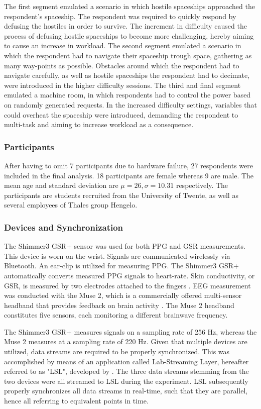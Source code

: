 \documentclass[12pt]{article}
\begin{document}
The first segment emulated a scenario in which hostile spaceships approached the respondent's spaceship. The respondent was required to quickly respond by defusing the hostiles in order to survive. The increment in difficulty caused the process of defusing hostile spaceships to become more challenging, hereby aiming to cause an increase in workload. The second segment emulated a scenario in which the respondent had to navigate their spaceship trough space, gathering as many way-points as possible. Obstacles around which the respondent had to navigate carefully, as well as hostile spaceships the respondent had to decimate, were introduced in the higher difficulty sessions. The third and final segment emulated a machine room, in which respondents had to control the power based on randomly generated requests. In the increased difficulty settings, variables that could overheat the spaceship were introduced, demanding the respondent to multi-task and aiming to increase workload as a consequence.

\subsubsection{Participants}
After having to omit 7 participants due to hardware failure, 27 respondents were included in the final analysis.  18 participants are female whereas 9 are male. The mean age and standard deviation are $\mu =26, \sigma = 10.31$ respectively. The participants are students recruited from the University of Twente, as well as several employees of Thales group Hengelo. 

\subsubsection{Devices and Synchronization}
The Shimmer3 GSR+ sensor was used for both PPG and GSR measurements. This device is worn on the wrist. Signals are communicated wirelessly via Bluetooth. An ear-clip is utilized for measuring PPG. The Shimmer3 GSR+ automatically converts measured PPG signals to heart-rate. Skin conductivity, or GSR, is measured by two electrodes attached to the fingers \cite{shimmer}. EEG measurement was conducted with the Muse 2, which is a commercially offered multi-sensor headband that provides feedback on brain activity \cite{muse}. The Muse 2 headband constitutes five sensors, each monitoring a different brainwave frequency.  

The Shimmer3 GSR+ measures signals on a sampling rate of 256 Hz, whereas the Muse 2 measures at a sampling rate of 220 Hz. Given that multiple devices are utilized, data streams are required to be properly synchronized. This was accomplished by means of an application called Lab-Streaming Layer, hereafter referred to as "LSL", developed by . The three data streams stemming from the two devices were all streamed to LSL during the experiment. LSL subsequently properly synchronizes all data streams in real-time,  such that they are parallel, hence all referring to equivalent points in time. 
\end{document}
